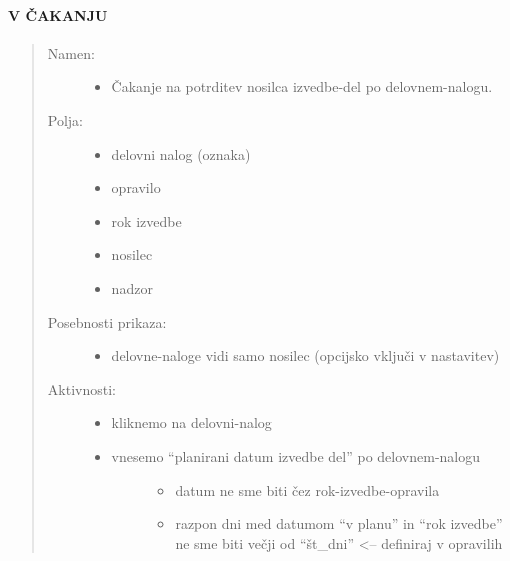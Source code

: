 \documentclass[letterpaper,10pt,english]{sphinxmanual}
\begin{document}
\paragraph{V ČAKANJU}
\label{view_za_izvajalca:v-cakanju}\begin{quote}
\begin{description}
\item[{Namen:}] \leavevmode\begin{itemize}
\item {} 
Čakanje na potrditev nosilca izvedbe-del po delovnem-nalogu.

\end{itemize}

\item[{Polja:}] \leavevmode\begin{itemize}
\item {} 
delovni nalog (oznaka)

\item {} 
opravilo

\item {} 
rok izvedbe

\item {} 
nosilec

\item {} 
nadzor

\end{itemize}

\item[{Posebnosti prikaza:}] \leavevmode\begin{itemize}
\item {} 
delovne-naloge vidi samo nosilec (opcijsko vključi v nastavitev)

\end{itemize}

\item[{Aktivnosti:}] \leavevmode\begin{itemize}
\item {} 
kliknemo na delovni-nalog

\item {} \begin{description}
\item[{vnesemo ``planirani datum izvedbe del'' po delovnem-nalogu}] \leavevmode\begin{itemize}
\item {} 
datum ne sme biti čez rok-izvedbe-opravila

\item {} 
razpon dni med datumom ``v planu'' in ``rok izvedbe'' ne sme biti večji od ``št\_dni'' \textless{}-- definiraj v opravilih


\end{itemize}
\end{description}
\end{itemize}
\end{description}
\end{quote}
\end{document}
